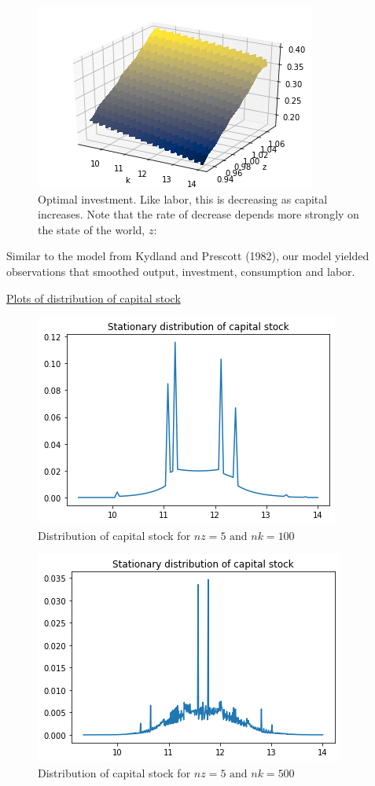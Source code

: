 \documentclass[12pt]{article}
\begin{document}
\begin{doublespace}
\begin{figure}[h]
\caption{Optimal investment. Like labor, this is decreasing as capital increases. Note that the rate of decrease depends more strongly on the state of the world, $z$:}
\includegraphics{3d_investment_plot_nz15_nk500}
\end{figure}

\clearpage

Similar to the model from Kydland and Prescott (1982), our model yielded observations that smoothed output, investment, consumption and labor.\\

\begin{center}
\normalsize\underline{Plots of distribution of capital stock}
\end{center}

\begin{figure}[h]
\caption{Distribution of capital stock for $nz=5 \mbox{ and } nk=100$}
\includegraphics{capital_distribution_nz5_nk100}
\end{figure}

\begin{figure}[h]
\caption{Distribution of capital stock for $nz=5 \mbox{ and } nk=500$}
\includegraphics{capital_distribution_nz5_nk500}
\end{figure}


\end{doublespace}
\end{document}

